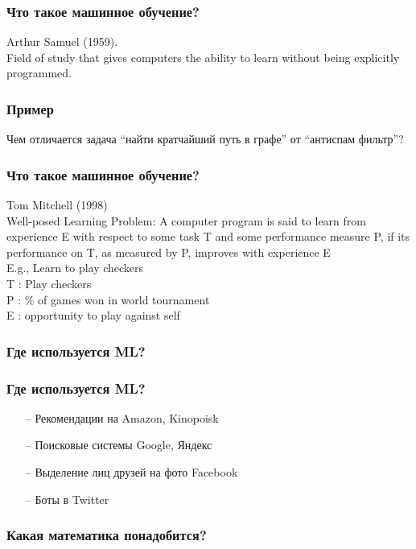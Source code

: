 \documentclass[12pt]{beamer}
\begin{document}
\begin{frame}\frametitle{Что такое машинное обучение?}
Arthur Samuel (1959). \\
\vspace{5mm}
Field of study that gives computers the ability to learn without being explicitly programmed.
\end{frame}

\begin{frame}\frametitle{Пример}
Чем отличается задача “найти кратчайший путь в графе” от “антиспам фильтр”?
\end{frame}

\begin{frame}\frametitle{Что такое машинное обучение?}
Tom Mitchell (1998) \\
\vspace{5mm}
Well-posed Learning Problem: A computer program is said to learn from experience E with respect to some task T and some performance measure P, if its performance on T, as measured by P, improves with experience E\\
\vspace{5mm}
E.g., Learn to play checkers\\ 
\vspace{5mm}
T : Play checkers\\
P : \% of games won in world tournament\\
E : opportunity to play against self\\
\end{frame}

\begin{frame}\frametitle{Где используется ML?}

\end{frame}

\begin{frame}\frametitle{Где используется ML?}
\begin{itemize}
  \item[--] Рекомендации на Amazon, Kinopoisk
  \item[--] Поисковые системы Google, Яндекс
  \item[--] Выделение лиц друзей на фото Facebook
  \item[--] Боты в Twitter
\end{itemize}
\end{frame}

\begin{frame}\frametitle{Какая математика понадобится?}

\end{frame}
\end{document}
